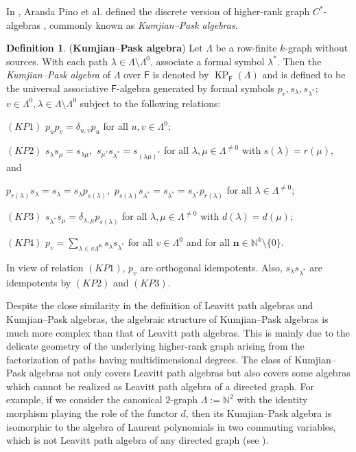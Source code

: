 \documentclass[a4paper,reqno,12pt]{amsart}
\numberwithin{equation}{section}
\theoremstyle{definition}
\newtheorem{dfn}[thm]{Definition}
\theoremstyle{remark}
\newcommand{\KP}{\operatorname{KP}}
\newcommand{\N}{\mathbf{n}}
\begin{document}
In \cite{Pino}, Aranda Pino et al. defined the discrete version of higher-rank graph $C^*$-algebras \cite{KumjianPask}, commonly known as \emph{Kumjian--Pask algebras}. 

\begin{dfn}\label{def KP-algebra}
({\bf Kumjian--Pask algebra}) Let $\Lambda$ be a row-finite $k$-graph without sources. With each path $\lambda\in \Lambda\setminus \Lambda^0$, associate a formal symbol $\lambda^*$. Then the \emph{Kumjian--Pask algebra} of $\Lambda$ over $\mathsf{F}$ is denoted by $\KP_\mathsf{F}(\Lambda)$ and is defined to be the universal associative $\mathsf{F}$-algebra generated by formal symbols $p_v,s_\lambda,s_{\lambda^*}$; $v\in \Lambda^0,\lambda\in \Lambda\setminus \Lambda^0$ subject to the following relations:

$(KP1)$ $p_up_v=\delta_{u,v}p_u$ for all $u,v\in \Lambda^0$;

$(KP2)$ $s_\lambda s_\mu=s_{\lambda\mu},$ $s_{\mu^*}s_{\lambda^*}=s_{(\lambda\mu)^*}$ for all $\lambda,\mu\in \Lambda^{\neq 0}$ with $s(\lambda)=r(\mu)$, and

$p_{r(\lambda)}s_\lambda=s_\lambda=s_\lambda p_{s(\lambda)},$ $p_{s(\lambda)}s_{\lambda^*}=s_{\lambda^*}=s_{\lambda^*}p_{r(\lambda)}$ for all $\lambda\in \Lambda^{\neq 0}$;

$(KP3)$ $s_{\lambda^*} s_\mu=\delta_{\lambda,\mu}p_{s(\lambda)}$ for all $\lambda,\mu\in \Lambda^{\neq 0}$ with $d(\lambda)=d(\mu)$;

$(KP4)$ $p_v=\displaystyle{\sum_{\lambda\in v\Lambda^\N}} s_\lambda s_{\lambda^*}$ for all $v\in \Lambda^0$ and for all $\N\in \mathbb{N}^k\setminus \{0\}$.
\end{dfn}

In view of relation $(KP1)$, $p_v$ are orthogonal idempotents. Also, $s_\lambda s_{\lambda^*}$ are idempotents by $(KP2)$ and $(KP3)$. 

Despite the close similarity in the definition of Leavitt path algebras and Kumjian--Pask algebras, the algebraic structure of Kumjian--Pask algebras is much more complex than that of Leavitt path algebras. This is mainly due to the delicate geometry of the underlying higher-rank graph arising from the factorization of paths having multidimensional degrees. The class of Kumjian--Pask algebras not only covers Leavitt path algebras but also covers some algebras which cannot be realized as Leavitt path algebra of a directed graph. For example, if we consider the canonical $2$-graph $\Lambda:=\mathbb{N}^2$ with the identity morphism playing the role of the functor $d$, then its Kumjian--Pask algebra is isomorphic to the algebra of Laurent polynomials in two commuting variables, which is not Leavitt path algebra of any directed graph (see \cite[Example 7.1]{Pino}).  
\end{document}
